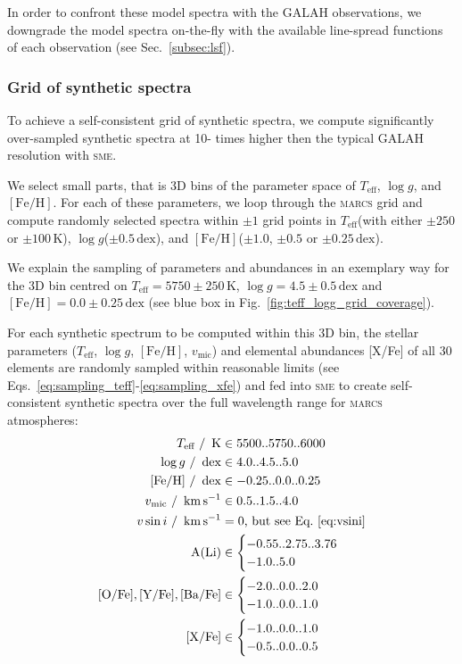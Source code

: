 \documentclass[
  journal=pasa,
  manuscript=research-paper, %
  year=2021,
  volume=37,
]{cup-journal}
\newcommand{\Teff}{$T_\mathrm{eff}$\xspace}
\newcommand{\logg}{$\log g$\xspace}
\newcommand{\feh}{$\mathrm{[Fe/H]}$\xspace}
\newcommand{\vmic}{$v_\mathrm{mic}$\xspace}
\newcommand{\sme}{\textsc{sme}\xspace}
\newcommand{\marcs}{\textsc{marcs}\xspace}
\newcommand{\dex}{\,\mathrm{dex}}	%
\newcommand{\K}{\,\mathrm{K}}	%
\newcommand{\kms}{\,\mathrm{km\,s^{-1}}}	%
\begin{document}
In order to confront these model spectra with the GALAH observations, we downgrade the model spectra on-the-fly with the available line-spread functions of each observation (see Sec.~\ref{subsec:lsf}).

\subsubsection{Grid of synthetic spectra} \label{subsubsec:spectrum_grid}

To achieve a self-consistent grid of synthetic spectra, we compute significantly over-sampled synthetic spectra at 10- times higher then the typical GALAH resolution with \sme.

We select small parts, that is 3D bins of the parameter space of \Teff, \logg, and \feh. For each of these parameters, we loop through the \marcs grid and compute randomly selected spectra within $\pm 1$ grid points in \Teff (with either $\pm 250$ or $\pm 100\K$), \logg ($\pm 0.5\dex$), and \feh ($\pm 1.0$, $\pm 0.5$ or $\pm 0.25\dex $).

We explain the sampling of parameters and abundances in an exemplary way for the 3D bin centred on $T_\text{eff} = 5750\pm250\K$, $\log g = 4.5\pm0.5\dex$ and $\mathrm{[Fe/H]} = 0.0\pm0.25\dex$ (see blue box in Fig.~\ref{fig:teff_logg_grid_coverage}).

For each synthetic spectrum to be computed within this 3D bin, the stellar parameters (\Teff, \logg, \feh, \vmic) and elemental abundances [X/Fe] of all 30 elements are randomly sampled within reasonable limits (see Eqs.~\ref{eq:sampling_teff}-\ref{eq:sampling_xfe}) and fed into \sme to create self-consistent synthetic spectra over the full wavelength range for \marcs atmospheres:
\begin{align} 
    T_\text{eff}~/~\K &\in {5500..5750..6000} \\ \label{eq:sampling_teff}
    \log g~/~\dex &\in {4.0..4.5..5.0} \\
    \mathrm{[Fe/H]}~/~\dex &\in {-0.25..0.0..0.25} \\
    v_\text{mic}~/~\kms &\in {0.5..1.5..4.0} \\
    v \sin i~/~\kms &= 0\text{, but see Eq.~\ref{eq:vsini}} \\
    \mathrm{A(Li)} &\in \begin{cases} {-0.55..2.75..3.76} \\ {-1.0..5.0}  \end{cases} \\
    \mathrm{[O/Fe]}, \mathrm{[Y/Fe]}, \mathrm{[Ba/Fe]} &\in \begin{cases} {-2.0..0.0..2.0} \\ {-1.0..0.0..1.0}  \end{cases} \\
    \mathrm{[X/Fe]} &\in \begin{cases} {-1.0..0.0..1.0} \\ {-0.5..0.0..0.5} \label{eq:sampling_xfe} \end{cases}
\end{align}
\end{document}
